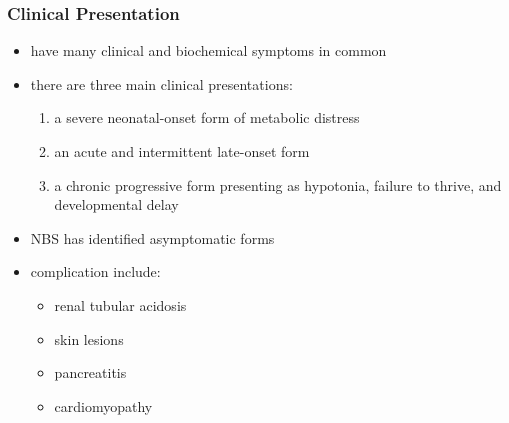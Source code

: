 \documentclass{scrartcl}
\begin{document}
\subsubsection{Clinical Presentation}
\label{sec:org36c8188}
\begin{itemize}
\item have many clinical and biochemical symptoms in common
\item there are three main clinical presentations:
\begin{enumerate}
\item a severe neonatal-onset form of metabolic distress
\item an acute and intermittent late-onset form
\item a chronic progressive form presenting as hypotonia, failure to
thrive, and developmental delay
\end{enumerate}
\item NBS has identified asymptomatic forms

\item complication include:
\begin{itemize}
\item renal tubular acidosis
\item skin lesions
\item pancreatitis
\item cardiomyopathy
\end{itemize}
\end{itemize}
\end{document}
